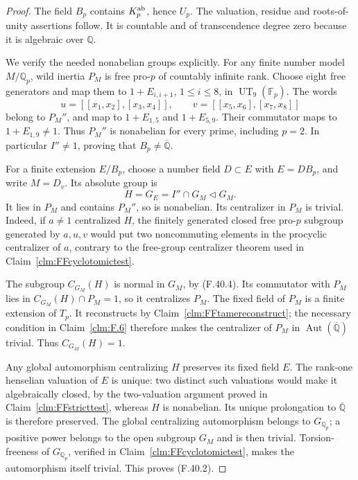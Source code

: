 \documentclass[11pt]{article}
\begin{document}
\begin{proof}
The field \(B_p\) contains
\(K_p^{\rm ab}\), hence \(U_p\).
The valuation, residue and roots-of-unity
assertions follow. It is countable and
of transcendence degree zero because
it is algebraic over \(\mathbb Q\).

We verify the needed nonabelian groups
explicitly. For any finite number model
\(M/\mathbb Q_p\), wild inertia
\(P_M\) is free pro-\(p\) of
countably infinite rank. Choose eight
free generators and map them to
\(1+E_{i,i+1}\), \(1\le i\le8\),
in \(\operatorname{UT}_9(\mathbb F_p)\).
The words
\[
 u=[[x_1,x_2],[x_3,x_4]],\qquad
 v=[[x_5,x_6],[x_7,x_8]]
\]
belong to \(P_M''\), and map to
\(1+E_{1,5}\) and \(1+E_{5,9}\).
Their commutator maps to
\(1+E_{1,9}\ne1\). Thus
\(P_M''\) is nonabelian for every
prime, including \(p=2\).
In particular \(I''\ne1\), proving
that \(B_p\ne\overline{\mathbb Q}\).

For a finite extension \(E/B_p\),
choose a number field \(D\subset E\)
with \(E=DB_p\), and write
\(M=D_v\). Its absolute group is
\[
                 H=G_E=I''\cap G_M
                             \triangleleft G_M.
                                                        \tag{F.40.4}
\]
It lies in \(P_M\) and contains
\(P_M''\), so is nonabelian.
Its centralizer in \(P_M\) is
trivial. Indeed, if \(a\ne1\)
centralized \(H\), the finitely
generated closed free pro-\(p\)
subgroup generated by \(a,u,v\)
would put two noncommuting elements
in the procyclic centralizer of
\(a\), contrary to the free-group
centralizer theorem used in
Claim~\ref{clm:FFcyclotomictest}.

The subgroup \(C_{G_M}(H)\) is
normal in \(G_M\), by (F.40.4).
Its commutator with \(P_M\) lies
in \(C_{G_M}(H)\cap P_M=1\),
so it centralizes \(P_M\).
The fixed field of \(P_M\) is
a finite extension of \(T_p\).
It reconstructs by
Claim~\ref{clm:FFtamereconstruct};
the necessary condition in
Claim~\ref{clm:F.6} therefore makes
the centralizer of \(P_M\) in
\(\operatorname{Aut}(\overline{\mathbb Q})\)
trivial. Thus \(C_{G_M}(H)=1\).

Any global automorphism centralizing
\(H\) preserves its fixed field
\(E\). The rank-one henselian
valuation of \(E\) is unique:
two distinct such valuations would
make it algebraically closed, by
the two-valuation argument proved
in Claim~\ref{clm:FFstricttest},
whereas \(H\) is nonabelian.
Its unique prolongation to
\(\overline{\mathbb Q}\) is
therefore preserved. The global
centralizing automorphism belongs
to \(G_{\mathbb Q_p}\); a positive
power belongs to the open subgroup
\(G_M\) and is then trivial.
Torsion-freeness of \(G_{\mathbb Q_p}\),
verified in Claim~\ref{clm:FFcyclotomictest},
makes the automorphism itself
trivial. This proves (F.40.2).


\end{proof}
\end{document}
